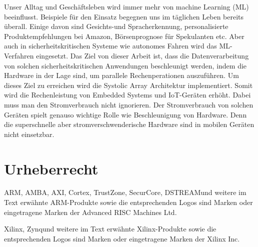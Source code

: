 Unser Alltag und Geschäftsleben wird immer mehr von machine Learning (ML) beeinflusst. Beispiele für den Einsatz begegnen uns im täglichen Leben bereits überall. Einige davon sind Gesichts-und Spracherkennung, personalisierte Produktempfehlungen bei Amazon, Börsenprognose für Spekulanten etc. Aber auch in sicherheitskritischen Systeme wie autonomes Fahren wird das ML-Verfahren eingesetzt. Das Ziel von dieser Arbeit ist, dass die Datenverarbeitung von solchen sicherheitskritischen Anwendungen beschleunigt werden, indem die Hardware in der Lage sind, um parallele Rechenperationen auszuführen. Um dieses Ziel zu erreichen wird die Systolic Array Architektur implementiert. Somit wird die Rechenleistung von Embedded Systems und IoT-Geräten erhöht. Dabei muss man den Stromverbrauch nicht ignorieren. Der Stromverbrauch von solchen Geräten spielt genauso wichtige Rolle wie Beschleunigung von Hardware. Denn die superschnelle  aber stromverschwenderische Hardware sind in mobilen Geräten nicht einsetzbar.  



\chapter*{Urheberrecht}

ARM\TReg, AMBA\TReg, AXI\TTra, Cortex\TTra, TrustZone\TTra, SecurCore\TTra  , DSTREAM\TTra und weitere im Text erwähnte ARM-Produkte sowie die entsprechenden Logos sind Marken oder eingetragene Marken der Advanced RISC Machines Ltd.\par
\vspace{0.5cm}
Xilinx\TReg, Zynq\TTra und weitere im Text erwähnte Xilinx-Produkte sowie die entsprechenden Logos sind Marken oder eingetragene Marken der Xilinx Inc.\par
\vspace{0.5cm}
